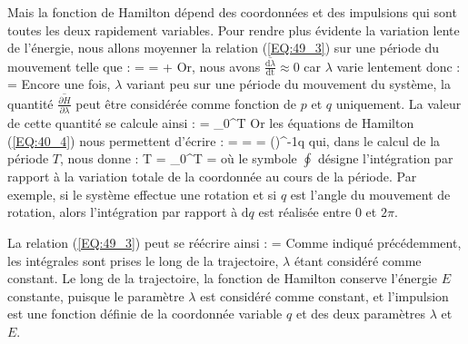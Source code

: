 Mais la fonction de Hamilton d\'{e}pend des coordonn\'{e}es et des impulsions qui sont toutes les deux rapidement variables. Pour rendre plus \'{e}vidente la variation lente de l'\'{e}nergie, nous allons moyenner la relation (\ref{EQ:49_3}) sur une p\'{e}riode du mouvement telle que :
\benn
	 =  =  + 
\eenn
Or, nous avons $\overline{\frac{\mathrm{d}\lambda}{\mathrm{dt}}}\approx 0$ car $\lambda$ varie lentement donc :
\be
	 =  \label{EQ:49_3}
\ee
Encore une fois, $\lambda$ variant peu sur une p\'{e}riode du mouvement du syst\`{e}me, la quantit\'{e} $\overline{\frac{\partial H}{\partial\lambda}}$ peut \^{e}tre consid\'{e}r\'{e}e comme fonction de $p$ et $q$ uniquement. La valeur de cette quantit\'{e} se calcule ainsi :
\benn
	 = \int_{0}^{T}{}
\eenn
Or les \'{e}quations de Hamilton (\ref{EQ:40_4}) nous permettent d'\'{e}crire :
\benn
	 =  =  \Leftrightarrow {} = \left(\right)^{-1}q
\eenn
qui, dans le calcul de la p\'{e}riode $T$, nous donne :
\be
	T = \int_{0}^{T}{} =  \label{EQ:49_4}
\ee
o\`{u} le symbole $\oint$ d\'{e}signe l'int\'{e}gration par rapport \`{a} la variation totale de la coordonn\'{e}e au cours de la p\'{e}riode. Par exemple, si le syst\`{e}me effectue une rotation et si $q$ est l'angle du mouvement de rotation, alors l'int\'{e}gration par rapport \`{a} $\mathrm{d}q$ est r\'{e}alis\'{e}e entre $0$ et $2\pi$.

La relation (\ref{EQ:49_3}) peut se r\'{e}\'{e}crire ainsi :
\be
	 =  \label{EQ:49_5}
\ee
Comme indiqu\'{e} pr\'{e}c\'{e}demment, les int\'{e}grales sont prises le long de la trajectoire, $\lambda$ \'{e}tant consid\'{e}r\'{e} comme constant. Le long de la trajectoire, la fonction de Hamilton conserve l'\'{e}nergie $E$ constante, puisque le param\`{e}tre $\lambda$ est consid\'{e}r\'{e} comme constant, et l'impulsion est une fonction d\'{e}finie de la coordonn\'{e}e variable $q$ et des deux param\`{e}tres $\lambda$ et $E$.

